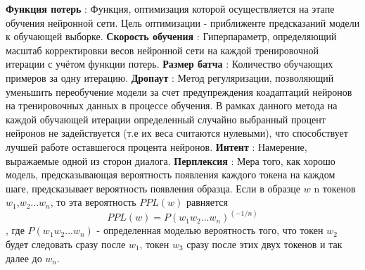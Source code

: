 \textbf{Функция потерь} : Функция, оптимизация которой осуществляется на этапе обучения нейронной сети. Цель оптимизации - приближенте предсказаний модели к обучающей выборке. 
\textbf{Скорость обучения} : Гиперпараметр, определяющий масштаб корректировки весов нейронной сети на каждой тренировочной итерации с учётом функции потерь. 
\textbf{Размер батча} : Количество обучающих примеров за одну итерацию.
\textbf{Дропаут} : Метод регуляризации, позволяющий уменьшить переобучение модели за счет предупреждения коадаптаций нейронов на тренировочных данных в процессе обучения. В рамках данного метода на каждой обучающей итерации определенный случайно выбранный процент нейронов не задействуется (т.е их веса считаются нулевыми), что способствует лучшей работе оставшегося процента нейронов. 
\textbf{Интент} : Намерение, выражаемые одной из сторон диалога. 
\textbf{Перплексия} : Мера того, как хорошо модель, предсказывающая вероятность появления каждого токена на каждом шаге, предсказывает вероятность появления образца. Если в образце $w$ n токенов $w_1$,$w_2$...$w_n$, то эта вероятность $PPL(w)$ равняется
\begin{equation} 
PPL(w) = P(w_1w_2... w_n)^(-1/n)
\end{equation},
где $P(w_1w_2... w_n)$ - определенная моделью вероятность того, что токен $w_2$ будет следовать сразу после $w_1$, токен $w_3$ сразу после этих двух токенов и так далее до $w_n$. 

